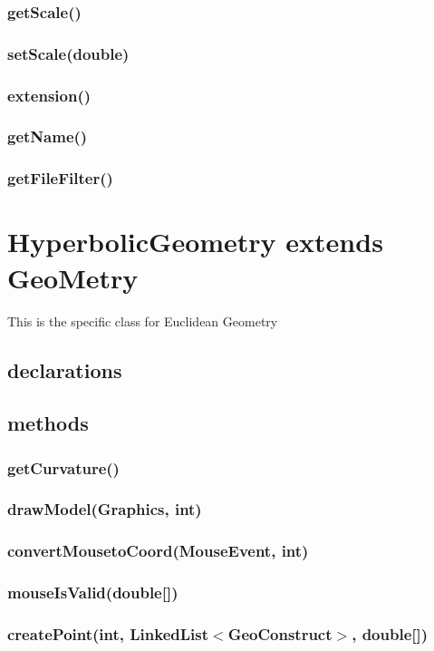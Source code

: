 \documentclass[a4paper,10pt]{report}
\begin{document}
\subsubsection{getScale()}
\subsubsection{setScale(double)}
\subsubsection{extension()}
\subsubsection{getName()}
\subsubsection{getFileFilter()}
\section{HyperbolicGeometry extends GeoMetry} This is the specific class for Euclidean Geometry
\subsection{declarations}
\subsubsection{}
\subsection{methods}
\subsubsection{getCurvature()}
\subsubsection{drawModel(Graphics, int)}
\subsubsection{convertMousetoCoord(MouseEvent, int)}
\subsubsection{mouseIsValid(double[])}
\subsubsection{createPoint(int, LinkedList$<$GeoConstruct$>$, double[])}
\end{document}
